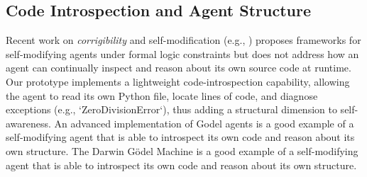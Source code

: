 \documentclass[11pt]{article}
\begin{document}
\subsection{Code Introspection and Agent Structure}
Recent work on \emph{corrigibility} and self-modification (e.g., \cite{Soares2015}) proposes frameworks for self-modifying agents under formal logic constraints but does not address how an agent can continually inspect and reason about its own source code at runtime. Our prototype implements a lightweight code-introspection capability, allowing the agent to read its own Python file, locate lines of code, and diagnose exceptions (e.g., `ZeroDivisionError`), thus adding a structural dimension to self-awareness.  An advanced implementation of Godel agents \cite{yin2024godel} is a good example of a self-modifying agent that is able to introspect its own code and reason about its own structure.  The Darwin Gödel Machine \cite{zhang2025darwin} is a good example of a self-modifying agent that is able to introspect its own code and reason about its own structure.
\end{document}
